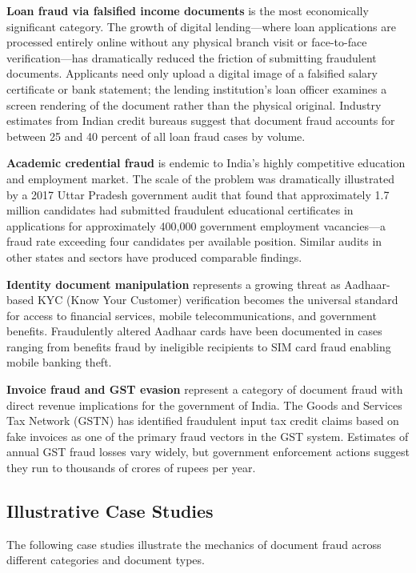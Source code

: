 \documentclass[12pt,a4paper,oneside]{report}
\begin{document}
\textbf{Loan fraud via falsified income documents} is the most economically
significant category. The growth of digital lending---where loan applications
are processed entirely online without any physical branch visit or face-to-face
verification---has dramatically reduced the friction of submitting fraudulent
documents. Applicants need only upload a digital image of a falsified salary
certificate or bank statement; the lending institution's loan officer examines
a screen rendering of the document rather than the physical original.
Industry estimates from Indian credit bureaus suggest that document fraud
accounts for between 25 and 40 percent of all loan fraud cases by volume.

\textbf{Academic credential fraud} is endemic to India's highly competitive
education and employment market. The scale of the problem was dramatically
illustrated by a 2017 Uttar Pradesh government audit that found that
approximately 1.7 million candidates had submitted fraudulent educational
certificates in applications for approximately 400,000 government
employment vacancies---a fraud rate exceeding four candidates per available
position. Similar audits in other states and sectors have produced comparable
findings.

\textbf{Identity document manipulation} represents a growing threat as
Aadhaar-based KYC (Know Your Customer) verification becomes the universal
standard for access to financial services, mobile telecommunications, and
government benefits. Fraudulently altered Aadhaar cards have been documented
in cases ranging from benefits fraud by ineligible recipients to SIM card
fraud enabling mobile banking theft.

\textbf{Invoice fraud and GST evasion} represent a category of document fraud
with direct revenue implications for the government of India. The Goods and
Services Tax Network (GSTN) has identified fraudulent input tax credit claims
based on fake invoices as one of the primary fraud vectors in the GST system.
Estimates of annual GST fraud losses vary widely, but government enforcement
actions suggest they run to thousands of crores of rupees per year.

\subsection{Illustrative Case Studies}

The following case studies illustrate the mechanics of document fraud across
different categories and document types.
\end{document}
